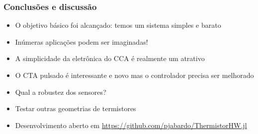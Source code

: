\documentclass[12pt,handout]{beamer}
\begin{document}
\begin{frame}
  \frametitle{Conclusões e discussão}

  \begin{itemize}
  \item O objetivo básico foi alcançado: temos um sistema simples e barato
  \item Inúmeras aplicações podem ser imaginadas!
  \item A simplicidade da eletrônica do CCA é realmente um atrativo
  \item O CTA pulsado é interessante e novo mas o controlador precisa ser melhorado
  \item Qual a robustez dos sensores?
  \item Testar outras geometrias de termistores
  \item Desenvolvimento aberto em \url{https://github.com/pjabardo/ThermistorHW.jl}
  \end{itemize}
\end{frame}

    
  
    
      
  
\end{document}
